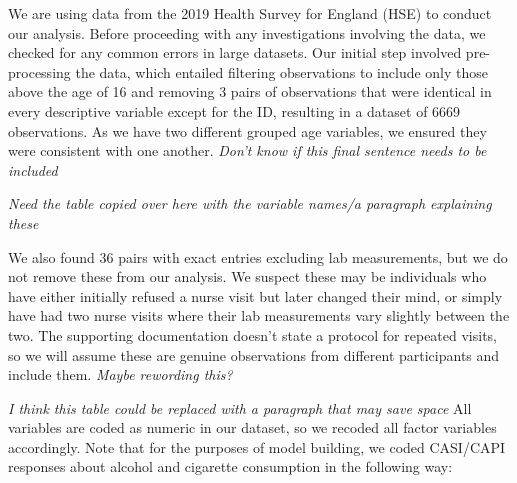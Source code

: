 \documentclass[
  11pt,
]{article}
\begin{document}
We are using data from the 2019 Health Survey for England (HSE) to
conduct our analysis. Before proceeding with any investigations
involving the data, we checked for any common errors in large datasets.
Our initial step involved pre-processing the data, which entailed
filtering observations to include only those above the age of 16 and
removing 3 pairs of observations that were identical in every
descriptive variable except for the ID, resulting in a dataset of 6669
observations. As we have two different grouped age variables, we ensured
they were consistent with one another. \emph{Don't know if this final
sentence needs to be included}

\emph{Need the table copied over here with the variable names/a
paragraph explaining these}

We also found 36 pairs with exact entries excluding lab measurements,
but we do not remove these from our analysis. We suspect these may be
individuals who have either initially refused a nurse visit but later
changed their mind, or simply have had two nurse visits where their lab
measurements vary slightly between the two. The supporting documentation
doesn't state a protocol for repeated visits, so we will assume these
are genuine observations from different participants and include them.
\emph{Maybe rewording this?}

\emph{I think this table could be replaced with a paragraph that may
save space} All variables are coded as numeric in our dataset, so we
recoded all factor variables accordingly. Note that for the purposes of
model building, we coded CASI/CAPI responses about alcohol and cigarette
consumption in the following way:
\end{document}
